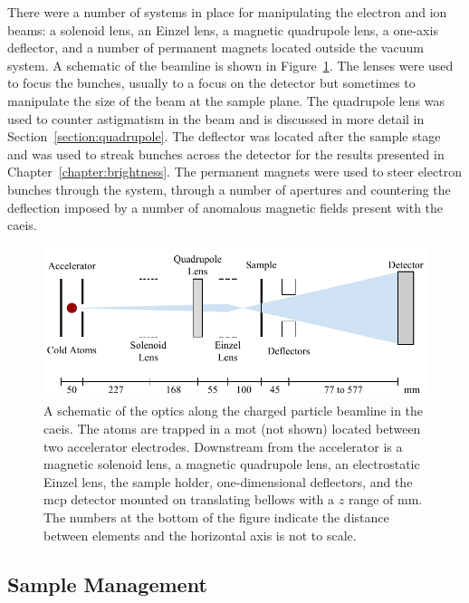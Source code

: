 There were a number of systems in place for manipulating the electron and ion beams: a solenoid lens, an Einzel lens, a magnetic quadrupole lens, a one-axis deflector, and a number of permanent magnets located outside the vacuum system.
A schematic of the beamline is shown in Figure~\ref{figure:full_beam_apparatus}.
The lenses were used to focus the bunches, usually to a focus on the detector but sometimes to manipulate the size of the beam at the sample plane.
The quadrupole lens was used to counter astigmatism in the beam and is discussed in more detail in Section~\ref{section:quadrupole}.
The deflector was located after the sample stage and was used to streak bunches across the detector for the results presented in Chapter~\ref{chapter:brightness}.
The permanent magnets were used to steer electron bunches through the system, through a number of apertures and countering the deflection imposed by a number of anomalous magnetic fields present with the \gls{caeis}.

\begin{figure}
    \center
    \includegraphics{part2/Figs/FullApparatusSchematic.pdf}
    \caption[Beam optics schematic.]{A schematic of the optics along the charged particle beamline in the \gls{caeis}. The atoms are trapped in a \gls{mot} (not shown) located between two accelerator electrodes. Downstream from the accelerator is a magnetic solenoid lens, a magnetic quadrupole lens, an electrostatic Einzel lens, the sample holder, one-dimensional deflectors, and the \gls{mcp} detector mounted on translating bellows with a $z$ range of \unit[500]{mm}. The numbers at the bottom of the figure indicate the distance between elements and the horizontal axis is not to scale.}
    \label{figure:full_beam_apparatus}
\end{figure}

\subsection{Sample Management}


